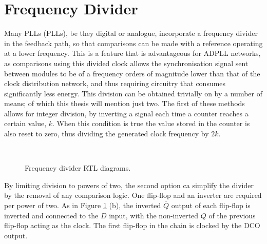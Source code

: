 \section{Frequency Divider}
Many \aclp{PLL} (\acsp{PLL}), be they digital or analogue, incorporate a frequency divider in the feedback path, so that comparisons can be made with a reference operating at a lower frequency. This is a feature that is advantageous for \ac{ADPLL} networks, as comparisons using this divided clock allows the synchronisation signal sent between modules to be of a frequency orders of magnitude lower than that of the clock distribution network, and thus requiring circuitry that consumes significantly less energy. This division can be obtained trivially on  by a number of means; of which this thesis will mention just two. The first of these methods allows for integer division, by inverting a signal each time a counter reaches a certain value, $k$. When this condition is true the value stored in the counter is also reset to zero, thus dividing the generated clock frequency by $2k$.
\begin{figure}[h]%
	\centering
	\\
	\caption[Frequency divider \ac{RTL} diagrams]{Frequency divider \ac{RTL} diagrams.}
	\label{fig:divs}
\end{figure}

By limiting division to powers of two, the second option ca simplify the divider by the removal of any comparison logic. One flip-flop and an inverter are required per power of two. As in Figure \ref{fig:divs} (b), the inverted $\overline{Q}$ output of each flip-flop is inverted and connected to the $D$ input, with the non-inverted $Q$ of the previous flip-flop acting as the clock. The first flip-flop in the chain is clocked by the \ac{DCO} output. 

